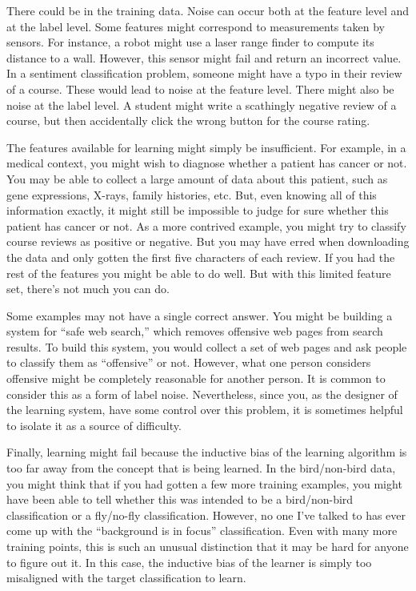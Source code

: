 There could be  in the training data.  Noise can occur
both at the feature level and at the label level.  Some features might
correspond to measurements taken by sensors.  For instance, a robot
might use a laser range finder to compute its distance to a wall.
However, this sensor might fail and return an incorrect value.  In a
sentiment classification problem, someone might have a typo in their
review of a course.  These would lead to noise at the feature level.
There might also be noise at the label level.  A student might write a
scathingly negative review of a course, but then accidentally click
the wrong button for the course rating.

The features available for learning might simply be insufficient.  For
example, in a medical context, you might wish to diagnose whether a
patient has cancer or not.  You may be able to collect a large amount
of data about this patient, such as gene expressions, X-rays, family
histories, etc.  But, even knowing all of this information exactly, it
might still be impossible to judge for sure whether this patient has
cancer or not.  As a more contrived example, you might try to classify
course reviews as positive or negative.  But you may have erred when
downloading the data and only gotten the first five characters of each
review.  If you had the rest of the features you might be able to do
well.  But with this limited feature set, there's not much you can do.

Some examples may not have a single correct answer.  You might be
building a system for ``safe web search,'' which removes offensive web
pages from search results.  To build this system, you would collect a
set of web pages and ask people to classify them as ``offensive'' or
not.  However, what one person considers offensive might be completely
reasonable for another person.  It is common to consider this as a
form of label noise.  Nevertheless, since you, as the designer of the
learning system, have some control over this problem, it is sometimes
helpful to isolate it as a source of difficulty.

Finally, learning might fail because the inductive bias of the
learning algorithm is too far away from the concept that is being
learned.  In the bird/non-bird data, you might think that if you had
gotten a few more training examples, you might have been able to tell
whether this was intended to be a bird/non-bird classification or a
fly/no-fly classification.  However, no one I've talked to has ever
come up with the ``background is in focus'' classification.  Even with
many more training points, this is such an unusual distinction that it
may be hard for anyone to figure out it.  In this case, the inductive
bias of the learner is simply too misaligned with the target
classification to learn.

